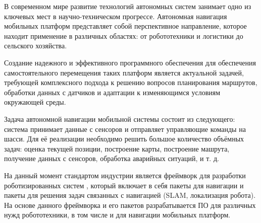 \label{sec:intro}

В современном мире развитие технологий автономных систем занимает одно из
ключевых мест в научно-техническом прогрессе. Автономная навигация мобильных
платформ представляет собой перспективное направление, которое находит
применение в различных областях: от робототехники и логистики до сельского
хозяйства.

Создание надежного и эффективного программного обеспечения для обеспечения
самостоятельного перемещения таких платформ является актуальной задачей,
требующей комплексного подхода к решению вопросов планирования маршрутов,
обработки данных с датчиков и адаптации к изменяющимся условиям окружающей
среды.

Задача автономной навигации мобильной системы состоит из следующего: система
принимает данные с сенсоров и отправляет управляющие команды на шасси. Для её
реализации необходимо решить большое количество объёмных задач: оценка текущей
позиции, построение карты, построение машрута, получение данных с сенсоров,
обработка аварийных ситуаций, и т. д.

На данный момент стандартом индустрии является фреймворк для разработки
роботизированных систем \ros, который включает в себя пакеты для навигации и
пакеты для решения задач связанных с навигацией (SLAM, локализация робота).
На основе данного фреймворка и его пакетов разрабатывается ПО для различных нужд
робототехники, в том числе и для навигации мобильных платформ. 



